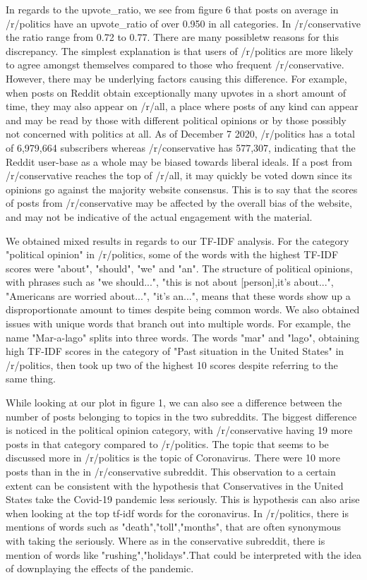 \documentclass[11pt]{article}
\begin{document}
In regards to the upvote\_ratio, we see from figure 6 that posts on average in /r/politics have an upvote\_ratio of over 0.950 in all categories. In /r/conservative the ratio range from 0.72 to 0.77. There are many possibletw reasons for this discrepancy. The simplest explanation is that users of /r/politics are more likely to agree amongst themselves compared to those who frequent /r/conservative. However, there may be underlying factors causing this difference. For example, when posts on Reddit obtain exceptionally many upvotes in a short amount of time, they may also appear on /r/all, a place where posts of any kind can appear and may be read by those with different political opinions or by those possibly not concerned with politics at all. As of December 7 2020, /r/politics has a total of 6,979,664 subscribers whereas /r/conservative has 577,307, indicating that the Reddit user-base as a whole may be biased towards liberal ideals. If a post from /r/conservative reaches the top of /r/all, it may quickly be voted down since its opinions go against the majority website consensus. This is to say that the scores of posts from /r/conservative may be affected by the overall bias of the website, and may not be indicative of the actual engagement with the material. 
\par
We obtained mixed results in regards to our TF-IDF analysis. For the category "political opinion" in /r/politics, some of the words with the highest TF-IDF scores were "about", "should", "we" and "an". The structure of political opinions, with phrases such as "we should...", "this is not about [person],it's about...", "Americans are worried about...", "it's an...", means that these words show up a disproportionate amount to times despite being common words. We also obtained issues with unique words that branch out into multiple words. For example, the name "Mar-a-lago" splits into three words. The words "mar" and "lago", obtaining high TF-IDF scores in the category of "Past situation in the United States" in /r/politics, then took up two of the highest 10 scores despite referring to the same thing.  
\par
While looking at our plot in figure 1, we can also see a difference between the number of posts belonging to topics in the two subreddits. The biggest difference is noticed in the political opinion category, with /r/conservative having 19 more posts in that category compared to /r/politics. The topic that seems to be discussed more in /r/politics is the topic of Coronavirus. There were 10 more posts than in the in /r/conservative subreddit. This observation to a certain extent can be consistent with the hypothesis that Conservatives in the United States take the Covid-19 pandemic less seriously. This is hypothesis can also arise when looking at the top tf-idf words for the coronavirus. In /r/politics, there is mentions of words such as "death","toll","months", that are often synonymous with taking the seriously. Where as in the conservative subreddit, there is mention of words like "rushing","holidays".That could be interpreted with the idea of downplaying the effects of the pandemic.
\end{document}
